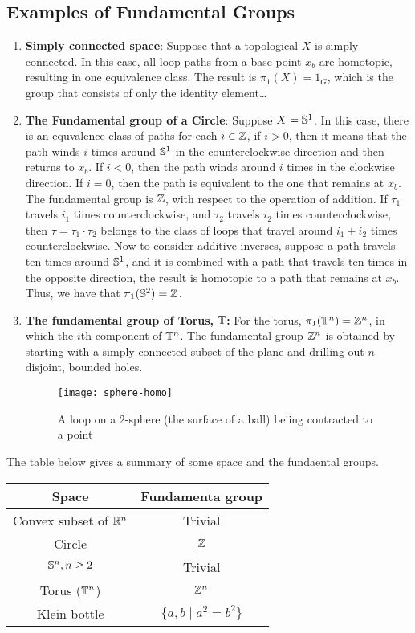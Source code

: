 \subsection{Examples of Fundamental Groups}
\begin{enumerate}
  \item \textbf{Simply connected space}: Suppose that a topological $X$ is simply connected. In this case, all loop paths from a base point $x_b$  are homotopic, resulting in one equivalence class. The result is $\pi_1(X) = 1_G$, which is the group that consists of only the identity element\dots

  \item \textbf{The Fundamental group of a Circle}: Suppose $X = \mathbb{S}^1$. In this case, there is an equvalence class of paths for each $i \in \mathbb{Z}$, if $i > 0$, then it means  that the path winds $i$ times around $\mathbb{S}^1$ in the counterclockwise direction and then returns to $x_b$. If $i < 0$, then the path winds around $i$ times in the clockwise direction. If $i = 0$, then the path is equivalent to the one that remains at $x_b$. The fundamental group is $\mathbb{Z}$, with respect to the operation of addition. If $\tau_1$ travels $i_1$ times counterclockwise, and $\tau_2$ travels $i_2$ times counterclockwise, then $\tau = \tau_1 \cdot \tau_2$ belongs to the class of loops that travel around $i_1 + i_2$ times counterclockwise. Now to consider additive inverses, suppose a path travels ten times around $\mathbb{S}^1$, and it is combined with a path that travels ten times in the opposite direction, the result is homotopic to a path that remains at $x_b$. Thus, we have that $\pi_1(\mathbb{S}^2) = \mathbb{Z}$.
  \item \textbf{The fundamental group of Torus, $\mathbb{T}$:} For the torus, $\pi_1(\mathbb{T}^n) = \mathbb{Z}^n$, in which the $i$th component of $\mathbb{T}^n$. The fundamental group $\mathbb{Z}^n$ is obtained by starting with a simply connected subset of the plane  and drilling out $n$ disjoint, bounded holes.
    \begin{figure}[H]
      \begin{center}
        \texttt{[image: sphere-homo]}
      \end{center}
      \caption{A loop on a $2$-sphere (the surface of a ball) beiing contracted to a point \cite{enwiki:fg}
}
    \end{figure}
\end{enumerate}
The table below gives a summary of some space and the fundaental groups.
\begin{table}[H]
  \centering
  \begin{tabular}{c|c}
    \hline
    Space & Fundamenta group \\
    \hline 
    Convex subset of $\mathbb{R}^n$ & Trivial \\
    Circle & $\mathbb{Z}$ \\
    $\mathbb{S}^n, n \ge 2$ & Trivial \\
    Torus ($\mathbb{T}^n$) & $\mathbb{Z}^n$ \\
    Klein bottle & $\{a, b \mid a^2 = b^2\}$
    \end{tabular}
\end{table}


